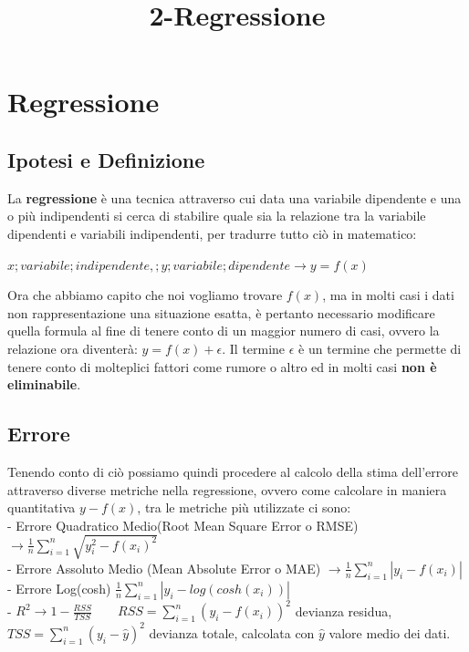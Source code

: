 \documentclass[11pt]{article}
\title{2-Regressione}
\begin{document}
    
    \maketitle
    
    

    
    \hypertarget{regressione}{%
\section{Regressione}\label{regressione}}

\hypertarget{ipotesi-e-definizione}{%
\subsection{Ipotesi e Definizione}\label{ipotesi-e-definizione}}

La \textbf{regressione} è una tecnica attraverso cui data una variabile
dipendente e una o più indipendenti si cerca di stabilire quale sia la
relazione tra la variabile dipendenti e variabili indipendenti, per
tradurre tutto ciò in matematico:

$ x;variabile;indipendente,; y;variabile;dipendente \rightarrow y =
f(x) $

Ora che abbiamo capito che noi vogliamo trovare \(f(x)\), ma in molti
casi i dati non rappresentazione una situazione esatta, è pertanto
necessario modificare quella formula al fine di tenere conto di un
maggior numero di casi, ovvero la relazione ora diventerà:
\(y = f(x) + \epsilon\). Il termine \(\epsilon\) è un termine che
permette di tenere conto di molteplici fattori come rumore o altro ed in
molti casi \textbf{non è eliminabile}.

\hypertarget{errore}{%
\subsection{Errore}\label{errore}}

Tenendo conto di ciò possiamo quindi procedere al calcolo della stima
dell'errore attraverso diverse metriche nella regressione, ovvero come
calcolare in maniera quantitativa \(y - f(x)\), tra le metriche più
utilizzate ci sono:\\
 - Errore Quadratico Medio(Root Mean Square Error o
RMSE)
$\rightarrow \frac{1}{n}\sum\limits_{i=1}^n\sqrt{y_{i}^2-f(x_{i})^2}$\\
- Errore Assoluto Medio (Mean Absolute Error o MAE)
$\rightarrow \frac{1}{n}\sum\limits_{i=1}^n|y_{i}-f(x_{i})|$\\
- Errore Log(cosh)
 $\frac{1}{n}\sum\limits_{i=1}^n |y_i - log(cosh(x_i))|$\\
- $R^2 \rightarrow 1 - \frac{RSS}{TSS} \qquad RSS = \sum\limits_{i=1}^n (y_{i}-f(x_{i}))^2$ devianza residua, $TSS = \sum\limits_{i=1}^n (y_{i}- \hat{y})^2 $ devianza totale, calcolata con $\hat{y}$ valore medio dei dati.\\
\end{document}
